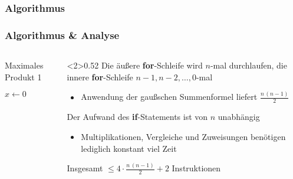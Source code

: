 \begin{frame}
\frametitle<1>{Algorithmus}
\frametitle<2>{Algorithmus \& Analyse}
\begin{columns}[T,onlytextwidth]
    \begin{column}{0.42\textwidth}
        \vspace{-5pt}
        \begin{algorithm}[H]
        	\caption{Maximales Produkt 1}
        	\label{alg:max_prod}
        	\DontPrintSemicolon
        	$x \gets 0$\;
        \end{algorithm}
    \end{column}
    \begin{column}<2>{0.52\textwidth}
        Die \"au{\ss}ere \textbf{for}-Schleife wird $n$-mal durchlaufen, die innere \textbf{for}-Schleife $n-1, n-2, \dots, 0$-mal
        \begin{itemize}
            \item Anwendung der \alert{gaußschen Summenformel} liefert $\frac{n \, (n-1)}{2}$
        \end{itemize}
        
        Der Aufwand des \textbf{if}-Statements ist von $n$ \alert{unabh\"angig}
        \begin{itemize}
            \item Multiplikationen, Vergleiche und Zuweisungen ben\"otigen lediglich \alert{konstant} viel Zeit
        \end{itemize}
        
        Insgesamt $\leq 4 \cdot \frac{n \, (n-1)}{2} + 2$ Instruktionen
    \end{column}
\end{columns}
\end{frame}


